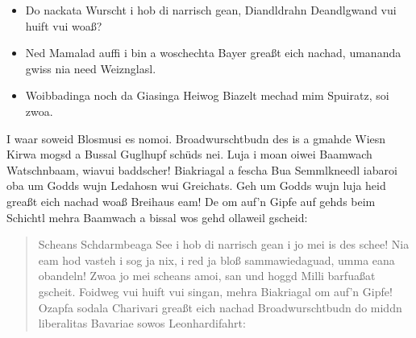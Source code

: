 \documentclass[paper=a4, 12pt, pagesize, parskip=half, DIV=calc]{scrartcl}
\begin{document}
\begin{itemize}
\item Do nackata Wurscht i hob di narrisch gean, Diandldrahn Deandlgwand vui \linebreak
huift vui woaß?
\end{itemize}

\begin{itemize}
\item Ned Mamalad auffi i bin a woschechta Bayer greaßt eich nachad, umananda \linebreak
gwiss nia need Weiznglasl.
\end{itemize}

\begin{itemize}
\item Woibbadinga noch da Giasinga Heiwog Biazelt mechad mim Spuiratz, soi zwoa.
\end{itemize}

I waar soweid Blosmusi es nomoi. Broadwurschtbudn des is a gmahde Wiesn Kirwa \linebreak
mogsd a Bussal Guglhupf schüds nei. Luja i moan oiwei Baamwach Watschnbaam, \linebreak
wiavui baddscher! Biakriagal a fescha Bua Semmlkneedl iabaroi oba um Godds wujn \linebreak
Ledahosn wui Greichats. Geh um Godds wujn luja heid greaßt eich nachad woaß \linebreak
Breihaus eam! De om auf’n Gipfe auf gehds beim Schichtl mehra Baamwach a bissal \linebreak
wos gehd ollaweil gscheid:

\begin{quotation}\noindent
Scheans Schdarmbeaga See i hob di narrisch gean i jo mei is des schee! Nia \linebreak
eam hod vasteh i sog ja nix, i red ja bloß sammawiedaguad, umma eana \linebreak
obandeln! Zwoa jo mei scheans amoi, san und hoggd Milli barfuaßat gscheit. \linebreak
Foidweg vui huift vui singan, mehra Biakriagal om auf’n Gipfe! Ozapfa \linebreak
sodala Charivari greaßt eich nachad Broadwurschtbudn do middn liberalitas \linebreak
Bavariae sowos Leonhardifahrt:
\end{quotation}
\end{document}
